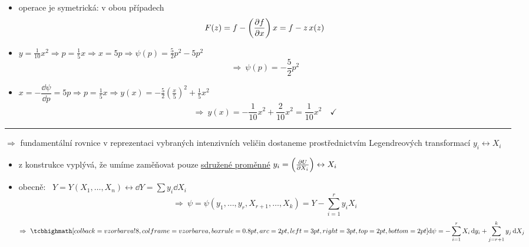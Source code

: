 \begin{itemize}
  \item operace je symetrická: v obou případech
  \[ F(z) = f - \left(\pdv{f}{x}\right)x = f - z\,x(z) \]
\end{itemize}

\begin{priklad}[Př:]
\begin{itemize}
  \item $y = \frac1{10}x^2 \Rightarrow p = \frac15x \Rightarrow x = 5p \Rightarrow \psi(p) = \frac52p^2 - 5p^2$
  \[ \Rightarrow\ \psi(p) = -\frac52p^2 \]
  \item $x = -\dfrac{\dd\psi}{\dd p} = 5p \Rightarrow p = \frac15x \Rightarrow y(x) = -\frac52\left(\frac{x}{5}\right)^2 + \frac15x^2$
  \[ \Rightarrow\ y(x) = -\frac1{10}x^2 + \frac{2}{10}x^2 = \frac1{10}x^2 \quad\checkmark \]
\end{itemize}
\end{priklad}
\begin{center}\rule{0.6\linewidth}{0.4pt}\end{center}

\begin{veta}
$\Rightarrow$ fundamentální rovnice v reprezentaci vybraných intenzivních veličin dostaneme prostřednictvím Legendreových transformací $y_i\leftrightarrow X_i$
\end{veta}
\begin{itemize}
  \item z konstrukce vyplývá, že umíme zaměňovat pouze \underline{sdružené proměnné} \quad $y_i = \left(\pdv{U}{X_i}\right)\leftrightarrow X_i$
\end{itemize}

\begin{minipage}{0.68\textwidth}
\begin{itemize}
  \item obecně: \ $Y = Y(X_1,\dots,X_n) \leftrightarrow \dd Y = \sum y_i\dd X_i$
  \[
    \Rightarrow\ \psi = \psi(y_1,\dots,y_r,X_{r+1},\dots,X_k) = Y - \sum_{i=1}^{r}y_iX_i
  \]
  \[
    \Rightarrow\ \vzorec{\dd\psi = -\sum_{i=1}^{r}X_i\,\dd y_i + \sum_{j=r+1}^{k}y_j\,\dd X_j}
  \]
\end{itemize}
\end{minipage}\hfill
\begin{minipage}{0.3\textwidth}
\end{minipage}

